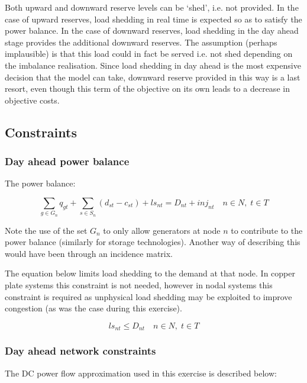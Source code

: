 \documentclass[number,times]{elsarticle}
\begin{document}
Both upward and downward reserve levels can be `shed', i.e. not provided. In the case of upward reserves, load shedding in real time is expected so as to satisfy the power balance. In the case of downward reserves, load shedding in the day ahead stage provides the additional downward reserves. The assumption (perhaps implausible) is that this load could in fact be served i.e. not shed depending on the imbalance realisation.  Since load shedding in day ahead is the most expensive decision that the model can take, downward reserve provided in this way is a last resort, even though this term of the objective on its own leads to a decrease in objective costs.

\subsection{Constraints}

\subsubsection{Day ahead power balance}

The power balance:

\begin{equation}
    \sum_{g \in G_n} q_{gt} + \sum_{s \in S_n} (d_{st} - c_{st}) + ls_{nt} = D_{nt} + inj_{nt} \quad n \in N, \; t \in T
\end{equation}

Note the use of the set $G_n$ to only allow generators at node $n$ to contribute to the power balance (similarly for storage technologies). Another way of describing this would have been through an incidence matrix.

The equation below limits load shedding to the demand at that node. In copper plate systems this constraint is not needed, however in nodal systems this constraint is required as unphysical load shedding may be exploited to improve congestion (as was the case during this exercise).

\begin{equation}
    ls_{nt} \leq D_{nt} \quad n \in N, \; t \in T
\end{equation}

\subsubsection{Day ahead network constraints}

The DC power flow approximation used in this exercise is described below:
\end{document}
